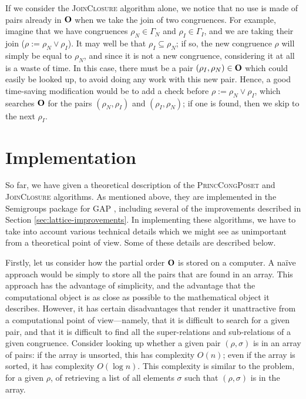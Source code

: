 If we consider the \textsc{JoinClosure} algorithm alone, we notice that no use
is made of pairs already in $\mathbf{O}$ when we take the join of two congruences.  For
example, imagine that we have congruences $\rho_N \in \Gamma_N$ and
$\rho_I \in \Gamma_I$, and we are taking their join
($\rho := \rho_N \vee \rho_I$).  It may well be that $\rho_I \subseteq \rho_N$;
if so, the new congruence $\rho$ will simply be equal to $\rho_N$, and since it
is not a new congruence, considering it at all is a waste of time.  In this
case, there must be a pair $(\rho_I, \rho_N) \in \mathbf{O}$ which could easily be
looked up, to avoid doing any work with this new pair.  Hence, a good
time-saving modification would be to add a check before
$\rho := \rho_N \vee \rho _I$, which searches $\mathbf{O}$ for the pairs
$(\rho_N, \rho_I)$ and $(\rho_I, \rho_N)$; if one is found, then we skip to the
next $\rho_I$.

\section{Implementation}
\label{sec:lattice-implementation}

So far, we have given a theoretical description of the \textsc{PrincCongPoset}
and \textsc{JoinClosure} algorithms.  As mentioned above, they are implemented
in the Semigroups package \cite{semigroups} for GAP \cite{gap}, including
several of the improvements described in Section \ref{sec:lattice-improvements}.
In implementing these algorithms, we have to take into account various technical
details which we might see as unimportant from a theoretical point of view.
Some of these details are described below.

Firstly, let us consider how the partial order $\mathbf{O}$ is stored on a computer.  A
na\"ive approach would be simply to store all the pairs that are found in an
array.  This approach has the advantage of simplicity, and the advantage that
the computational object is as close as possible to the mathematical object it
describes.  However, it has certain disadvantages that render it unattractive
from a computational point of view---namely, that it is difficult to search for
a given pair, and that it is difficult to find all the super-relations and
sub-relations of a given congruence.  Consider looking up whether a given pair
$(\rho,\sigma)$ is in an array of pairs: if the array is unsorted, this has
complexity $O(n)$; even if the array is sorted, it has complexity $O(\log n)$.
This complexity is similar to the problem, for a given $\rho$, of retrieving a
list of all elements $\sigma$ such that $(\rho, \sigma)$ is in the array.

